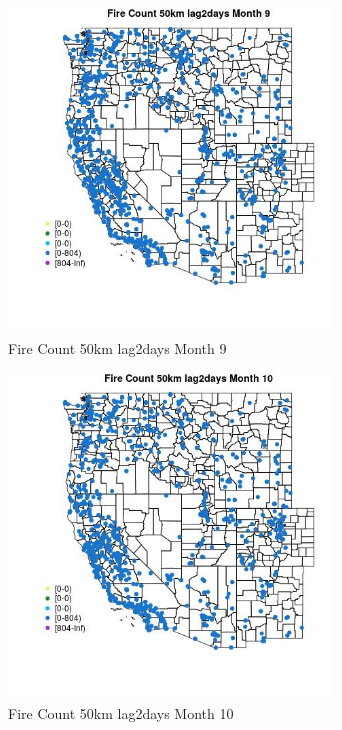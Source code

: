 \begin{figure} 
\centering  
\includegraphics[width=0.77\textwidth]{Code_Outputs/Report_ML_input_PM25_Step4_part_f_de_duplicated_aveswNAs_MapObsMo9Fire_Count_50km_lag2days.jpg} 
\caption{\label{fig:Report_ML_input_PM25_Step4_part_f_de_duplicated_aveswNAsMapObsMo9Fire_Count_50km_lag2days}Fire Count 50km lag2days Month 9} 
\end{figure} 
 

\clearpage 

\begin{figure} 
\centering  
\includegraphics[width=0.77\textwidth]{Code_Outputs/Report_ML_input_PM25_Step4_part_f_de_duplicated_aveswNAs_MapObsMo10Fire_Count_50km_lag2days.jpg} 
\caption{\label{fig:Report_ML_input_PM25_Step4_part_f_de_duplicated_aveswNAsMapObsMo10Fire_Count_50km_lag2days}Fire Count 50km lag2days Month 10} 
\end{figure} 
 

